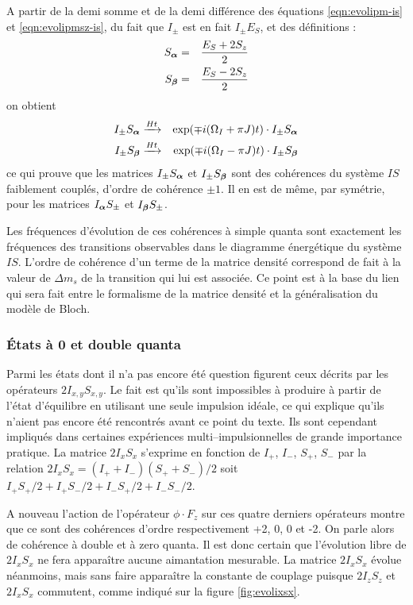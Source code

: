 A partir de la demi somme et de la demi différence des équations 
\ref{eqn:evolipm-is} et \ref{eqn:evolipmsz-is},
du fait que $I_{\pm}$ est en fait $I_{\pm}E_S$,
et des définitions :
\begin{eqnarray}
S_{\boldsymbol{\alpha}} & = & \frac{E_S + 2S_z}{2} \\
S_{\boldsymbol{\beta}} & = & \frac{E_S - 2S_z}{2}
\end{eqnarray}
on obtient
\begin{eqnarray}
\label{eqn:evolipmsa-is} I_{\pm}S_{\boldsymbol{\alpha}} & \xrightarrow{Ht} &
\exp(\mp i (\Omega_I + \pi J)t) \cdot I_{\pm}S_{\boldsymbol{\alpha}} \\
\label{eqn:evolipmsb-is} I_{\pm}S_{\boldsymbol{\beta}} & \xrightarrow{Ht} &
\exp(\mp i (\Omega_I - \pi J)t) \cdot I_{\pm}S_{\boldsymbol{\beta}}
\end{eqnarray}
ce qui prouve que les matrices $I_{\pm}S_{\boldsymbol{\alpha}}$ et $I_{\pm}S_{\boldsymbol{\beta}}$ 
sont des cohérences du système $IS$ faiblement couplés,
d'ordre de cohérence $\pm 1$.
Il en est de même, par symétrie, pour les matrices $I_{\boldsymbol{\alpha}}S_{\pm}$ et $I_{\boldsymbol{\beta}}S_{\pm}$.

Les fréquences d'évolution de ces cohérences à simple quanta sont exactement les
fréquences des transitions observables dans le diagramme énergétique du système $IS$.
L'ordre de cohérence d'un terme de la matrice densité
correspond de fait à la valeur de $\Delta m_s$ de la transition qui lui est associée.
Ce point est à la base du lien qui sera fait entre le formalisme
de la matrice densité et la généralisation du modèle de Bloch.

\subsubsection{États à 0 et double quanta}
Parmi les états dont il n'a pas encore été question figurent ceux décrits
par les opérateurs $2I_{x,y}S_{x,y}$.
Le fait est qu'ils sont impossibles à produire à partir de l'état d'équilibre
en utilisant une seule impulsion idéale, ce qui
explique qu'ils n'aient pas encore été rencontrés avant ce point du texte.
Ils sont cependant impliqués dans certaines expériences multi--impulsionnelles
de grande importance pratique.
La matrice $2I_xS_x$ s'exprime en fonction de $I_+$, $I_-$, $S_+$, $S_-$
par la relation $2I_xS_x = (I_+ + I_-)(S_+ + S_-)/2$ soit 
$I_+S_+/2 + I_+S_-/2 + I_-S_+/2 + I_-S_-/2$. 

A nouveau l'action de l'opérateur $\phi \cdot F_z$ sur ces quatre derniers
opérateurs montre que ce sont des cohérences d'ordre respectivement +2, 0, 0 et -2.
On parle alors de cohérence à double et à zero quanta.
Il est donc certain que l'évolution libre de $2I_xS_x$ ne fera apparaître 
aucune aimantation mesurable.
La matrice $2I_xS_x$ évolue néanmoins, mais sans faire apparaître la constante de 
couplage puisque $2I_zS_z$ et $2I_xS_x$ commutent, comme
indiqué sur la figure \ref{fig:evolixsx}.

